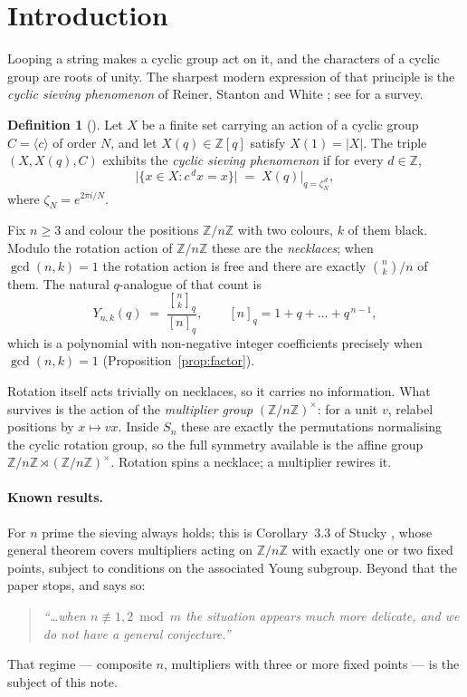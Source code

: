 \documentclass[11pt,a4paper]{article}
\theoremstyle{plain}
\theoremstyle{definition}
\newtheorem{definition}[theorem]{Definition}
\theoremstyle{remark}
\newcommand{\Z}{\mathbb{Z}}
\newcommand{\Zn}{\Z/n\Z}
\newcommand{\units}[1]{(\Z/#1\Z)^{\times}}
\newcommand{\qint}[1]{[#1]_q}
\newcommand{\qbin}[2]{\genfrac[]{0pt}{}{#1}{#2}_{q}}
\begin{document}
\section{Introduction}

Looping a string makes a cyclic group act on it, and the characters of a cyclic group are
roots of unity. The sharpest modern expression of that principle is the \emph{cyclic
sieving phenomenon} of Reiner, Stanton and White \cite{rsw}; see \cite{sagan} for a survey.

\begin{definition}[\cite{rsw}]\label{def:csp}
Let $X$ be a finite set carrying an action of a cyclic group $C=\langle c\rangle$ of order
$N$, and let $X(q)\in\Z[q]$ satisfy $X(1)=|X|$. The triple $(X,X(q),C)$ exhibits the
\emph{cyclic sieving phenomenon} if for every $d\in\Z$,
\[
  \bigl|\{x\in X: c^{\,d}x=x\}\bigr| \;=\; X(q)\big|_{q=\zeta_N^{\,d}},
\]
where $\zeta_N=e^{2\pi i/N}$.
\end{definition}

Fix $n\ge 3$ and colour the positions $\Zn$ with two colours, $k$ of them black. Modulo the
rotation action of $\Zn$ these are the \emph{necklaces}; when $\gcd(n,k)=1$ the rotation
action is free and there are exactly $\binom{n}{k}/n$ of them. The natural $q$-analogue of
that count is
\begin{equation}\label{eq:Y}
  Y_{n,k}(q)\;=\;\frac{\qbin{n}{k}}{\qint{n}},
  \qquad \qint{n}=1+q+\dots+q^{\,n-1},
\end{equation}
which is a polynomial with non-negative integer coefficients precisely when $\gcd(n,k)=1$
(Proposition~\ref{prop:factor}).

Rotation itself acts trivially on necklaces, so it carries no information. What survives is
the action of the \emph{multiplier group} $\units{n}$: for a unit $v$, relabel positions by
$x\mapsto vx$. Inside $S_n$ these are exactly the permutations normalising the cyclic
rotation group, so the full symmetry available is the affine group
$\Zn\rtimes\units{n}$. Rotation spins a necklace; a multiplier rewires it.

\paragraph{Known results.}
For $n$ prime the sieving always holds; this is Corollary~3.3 of Stucky \cite{stucky},
whose general theorem covers multipliers acting on $\Zn$ with exactly one or two fixed
points, subject to conditions on the associated Young subgroup. Beyond that the paper
stops, and says so:
\begin{quote}
\emph{``\dots when $n\not\equiv 1,2 \bmod m$ the situation appears much more delicate, and we
do not have a general conjecture.''} \cite[\S3]{stucky}
\end{quote}
That regime --- composite $n$, multipliers with three or more fixed points --- is the
subject of this note.
\end{document}
